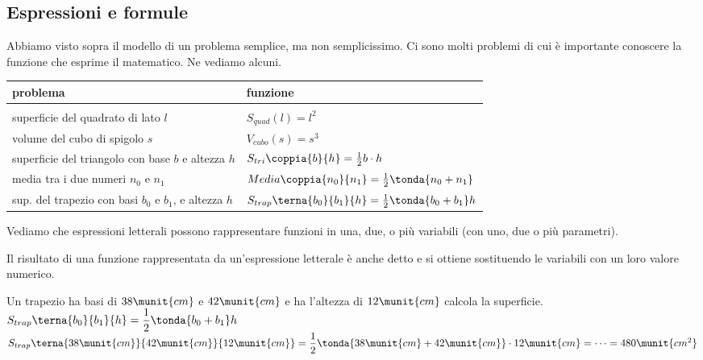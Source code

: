 \subsection{Espressioni e formule}
\label{subsec:calclett_formule}

Abbiamo visto sopra il modello di un problema semplice, 
ma non semplicissimo.
Ci sono molti problemi di cui è importante conoscere la funzione che 
esprime il  matematico.
Ne vediamo alcuni.

\begin{center}
\begin{tabular}{ll}
problema & funzione\\
\hline\\
superficie del quadrato di lato \(l\) & \(S_{quad}(l) = l^2\)\\[.5em]
volume del cubo di spigolo \(s\) & \(V_{cubo} (s) = s^3\) \\[.5em]
superficie del triangolo con base \(b\) e altezza \(h\) & 
\(S_{tri}\coppia{b}{h} = \frac{1}{2} b \cdot h\) \\[.5em]
media tra i due numeri \(n_0\) e \(n_1\) & 
\(Media\coppia{n_0}{n_1} = \frac{1}{2}\tonda{n_0 + n_1}\) \\[.5em]
sup. del trapezio con basi \(b_0\) e \(b_1\), e altezza \(h\) & 
\(S_{trap}\terna{b_0}{b_1}{h} = \frac{1}{2} \tonda{b_0 + b_1} h\) \\[1em]
\hline
\end{tabular}
\end{center}

Vediamo che espressioni letterali possono rappresentare funzioni in una, 
due, o più variabili (con uno, due o più parametri).

Il risultato di una funzione rappresentata da un'espressione letterale è 
anche detto  e si ottiene 
sostituendo le variabili con un loro valore numerico.

\begin{esempio}{}{}
Un trapezio ha basi di \(38\munit{cm}\) e \(42\munit{cm}\) e ha l'altezza 
di \(12\munit{cm}\) calcola la superficie.\\
\(S_{trap}\terna{b_0}{b_1}{h} = \dfrac{1}{2} \tonda{b_0 + b_1} h\)\\
\(S_{trap}\terna{38\munit{cm}}{42\munit{cm}}{12\munit{cm}} = 
  \dfrac{1}{2} \tonda{38\munit{cm} + 42\munit{cm}} \cdot 12\munit{cm} =
  \dots =
  480\munit{cm^2}
\)
\end{esempio}

